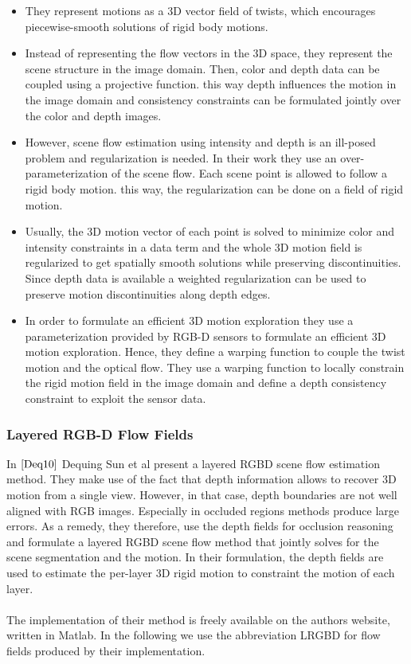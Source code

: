 \begin{itemize}
  \item They represent motions as a 3D vector field of twists, which encourages piecewise-smooth solutions of rigid body motions.
  \item Instead of representing the flow vectors in the 3D space, they represent the scene structure in the image domain. Then, color and depth data can be coupled using a projective function. this way depth influences the motion in the image domain and consistency constraints can be formulated jointly over the color and depth images. 
  \item However, scene flow estimation using intensity and depth is an ill-posed problem and regularization is needed. In their work they use an over-parameterization of the scene flow. Each scene point is allowed to follow a rigid body motion. this way, the regularization can be done on a field of rigid motion.
  \item Usually, the 3D motion vector of each point is solved to minimize color and intensity constraints in a data term and the whole 3D motion field is regularized to get spatially smooth solutions while preserving discontinuities. Since depth data is available a weighted regularization can be used to preserve motion discontinuities along depth edges. 
  \item In order to formulate an efficient 3D motion exploration they use a parameterization provided by RGB-D sensors to formulate an efficient 3D motion exploration. Hence, they define a warping function to couple the twist motion and the optical flow. They use a warping function to locally constrain the rigid motion field in the image domain and define a depth consistency constraint to exploit the sensor data.
\end{itemize}

\subsubsection{Layered RGB-D Flow Fields}
\label{sec:lrgbd_flows}
In $\cite{Deq10}$ Dequing Sun et al present a layered RGBD scene flow estimation  method. They make use of the fact that depth information allows to recover 3D motion from a single view. However, in that case, depth boundaries are not well aligned with RGB images. Especially in occluded regions methods produce large errors. As a remedy, they therefore, use the depth fields for occlusion reasoning and formulate a layered RGBD scene flow method that jointly solves for the scene segmentation and the motion. In their formulation, the depth fields are used to estimate the per-layer 3D rigid motion to constraint the motion of each layer. \\ \\
The implementation of their method is freely available on the authors website, written in Matlab. In the following we use the abbreviation LRGBD for flow fields produced by their implementation. 

